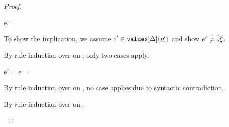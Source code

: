 \begin{proof}
\begin{byCases}
\begin{byCases}
      \begin{byCases}
      \item[\text{(\ref{rule:VNum}) and (\ref{rule:TNum})}]
        \begin{pfsteps}
        \item e= 
        \end{pfsteps}
        To show the implication, we assume $\inValues{e'}{\Delta}{\hnum{n'}}$ and show
        $\cnotsatisfyormay{e'}{\hxi}$.
        \begin{pfsteps}
        \item {}  
        \end{pfsteps}
        By rule induction over  on
        , only two cases apply.
        \begin{byCases}
        \item[\text{(\ref{rule:IVVal})}]
          \begin{pfsteps}
          \item e' = e =  
          \item {} 
          \end{pfsteps}
        \item[\text{(\ref{rule:IVIndet})}]
          \begin{pfsteps}
          \item {}  
          \end{pfsteps}
          By rule induction over  on
          , no case applies due to syntactic contradiction.
        \end{byCases}
      \end{byCases}
    \item[\text{(\ref{rule:FIndet})}]
      \begin{pfsteps}
        \item {}  
      \end{pfsteps}
    By rule induction over  on .
      \begin{byCases}
        \item[\text{(\ref{rule:IEHole})}]
        \begin{pfsteps*}

\end{pfsteps*}
\end{byCases}
\end{byCases}
\end{byCases}
\end{proof}
